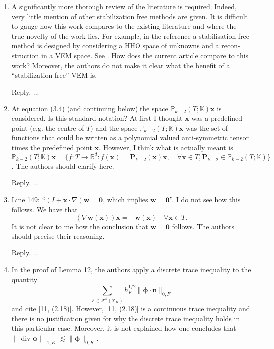 \documentclass[10pt]{amsart}
\theoremstyle{definition}
\theoremstyle{remark}
\renewcommand{\div}{\operatorname{div}}
\begin{document}
\begin{enumerate}[1.]
\item \textsf{A significantly more thorough review of the literature is required. Indeed, very little mention of other stabilization free methods are given. It is difficult to gauge how this work compares to the existing literature and where the true novelty of the work lies. For example, in the reference \cite{CicuttinErnLemaire2019} a stabilisation free method is designed by considering a HHO space of unknowns and a recon- struction in a VEM space. See \cite[Remark 5.1]{CicuttinErnLemaire2019}. How does the current article compare to this work? Moreover, the authors do not make it clear what the benefit of a “stabilization-free” VEM is.}

\smallskip \noindent \textcolor[rgb]{1.00,0.00,0.00}{Reply.}
...

\medskip

\item \textsf{At equation (3.4) (and continuing below) the space $\mathbb P_{k-2}(T;\mathbb K)\boldsymbol{x}$ is considered. Is this standard notation? At first I thought $\boldsymbol{x}$ was a predefined point (e.g. the centre of $T$) and the space $\mathbb P_{k-2}(T;\mathbb K)\boldsymbol{x}$ was the set of functions that could be written as a polynomial valued anti-symmetric tensor times the predefined point $\boldsymbol{x}$. However, I think what is actually meant is $\mathbb P_{k-2}(T;\mathbb K)\boldsymbol{x}=\{f:T\to\mathbb R^d: f(\boldsymbol{x})=\boldsymbol{P}_{k-2}(\boldsymbol{x})\boldsymbol{x},\quad \forall\boldsymbol{x}\in T, \boldsymbol{P}_{k-2}\in \mathbb P_{k-2}(T;\mathbb K)\}$. The authors should clarify here.}

\smallskip \noindent \textcolor[rgb]{1.00,0.00,0.00}{Reply.}
...

\medskip

\item \textsf{Line 149: “$(I +\boldsymbol{x}\cdot\nabla)\boldsymbol{w} = \boldsymbol{0}$, which implies $\boldsymbol{w} = \boldsymbol{0}$”. I do not see how this follows. We have that
$$(\nabla\boldsymbol{w}(\boldsymbol{x}))\boldsymbol{x}=-\boldsymbol{w}(\boldsymbol{x})\quad\forall\boldsymbol{x}\in T.
$$
It is not clear to me how the conclusion that $\boldsymbol{w} = \boldsymbol{0}$ follows. The authors
should precise their reasoning.}

\smallskip \noindent \textcolor[rgb]{1.00,0.00,0.00}{Reply.}
...

\medskip

\item \textsf{In the proof of Lemma 12, the authors apply a discrete trace inequality to the
quantity 
$$
\sum_{F\in\mathcal F^{\partial}(\mathcal T_K)}h_F^{1/2}\|\boldsymbol{\phi}\cdot\boldsymbol{n}\|_{0,F}
$$
and cite [11, (2.18)]. However, [11, (2.18)] is a continuous trace inequality and there is no justification given for why the discrete trace inequality holds in this particular case. Moreover, it is not explained how one concludes that $\|\div\boldsymbol{\phi}\|_{-1,K}\lesssim \|\boldsymbol{\phi}\|_{0,K}$.}


\end{enumerate}
\end{document}
